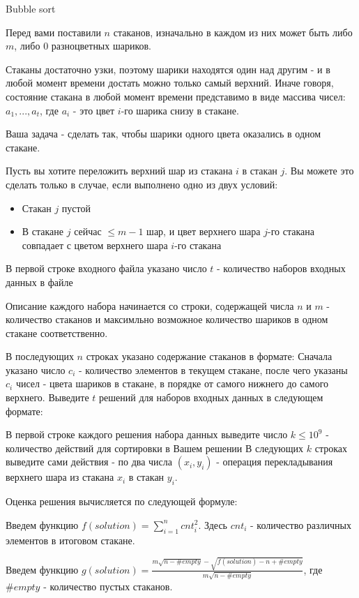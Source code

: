 \begin{problem}{Bubble sort}{}{}{}

Перед вами поставили $n$ стаканов, изначально в каждом из них может быть либо $m$, либо $0$ разноцветных шариков.

Стаканы достаточно узки, поэтому шарики находятся один над другим - и в любой момент времени достать можно только самый верхний. Иначе говоря, состояние стакана в любой момент времени представимо в виде массива чисел: $a_1, ..., a_t$, где $a_i$ - это цвет $i$-го шарика снизу в стакане.

Ваша задача - сделать так, чтобы шарики одного цвета оказались в одном стакане.

Пусть вы хотите переложить верхний шар из стакана $i$ в стакан $j$. Вы можете это сделать только в случае, если выполнено одно из двух условий:
\begin{itemize}
    \item{Стакан $j$ пустой}
    \item{В стакане $j$ сейчас $\leq m - 1$ шар, и цвет верхнего шара $j$-го стакана совпадает с цветом верхнего шара $i$-го стакана}
\end{itemize}

В первой строке входного файла указано число $t$ - количество наборов входных данных в файле

Описание каждого набора начинается со строки, содержащей числа $n$ и $m$ - количество стаканов и максимльно возможное количество шариков в одном стакане соответственно.

В последующих $n$ строках указано содержание стаканов в формате:
Сначала указано число $c_i$ - количество элементов в текущем стакане, после чего указаны $c_i$ чисел - цвета шариков в стакане, в порядке от самого нижнего до самого верхнего.
Выведите $t$ решений для наборов входных данных в следующем формате:

В первой строке каждого решения набора данных выведите число $k \leq 10^{9}$ - количество действий для сортировки в Вашем решении
В следующих $k$ строках выведите сами действия - по два числа $(x_i, y_i)$ - операция перекладывания верхнего шара из стакана $x_i$ в стакан $y_i$.

Оценка решения вычисляется по следующей формуле:

Введем функцию $f(solution) = \sum_{i=1}^n cnt_i^2$. Здесь $cnt_i$ - количество различных элементов в итоговом стакане.

Введем функцию $g(solution) = \frac{m\sqrt{n - \#empty} - \sqrt{f(solution) - n + \#empty}}{m\sqrt{n - \#empty}}$, где $\#empty$ - количество пустых стаканов. 


\end{problem}
